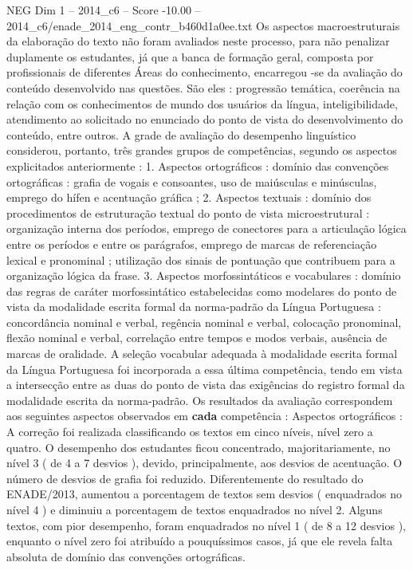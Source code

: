 \begin{textsample}{NEG Dim 1 – 2014\_c6 – Score -10.00 – 2014\_c6/enade\_2014\_eng\_contr\_b460d1a0ee.txt}
Os aspectos macroestruturais da elaboração do texto não foram avaliados neste processo, para não penalizar duplamente os estudantes, já que a banca de formação geral, composta por profissionais de diferentes Áreas do conhecimento, encarregou -se da avaliação do conteúdo desenvolvido nas questões.
São eles : progressão temática, coerência na relação com os conhecimentos de mundo dos usuários da língua, inteligibilidade, atendimento ao solicitado no enunciado do ponto de vista do desenvolvimento do conteúdo, entre outros.
A grade de avaliação do desempenho linguístico considerou, portanto, três grandes grupos de competências, segundo os aspectos explicitados anteriormente : 1.
Aspectos ortográficos : domínio das convenções ortográficas : grafia de vogais e consoantes, uso de maiúsculas e minúsculas, emprego do hífen e acentuação gráfica ; 2.
Aspectos textuais : domínio dos procedimentos de estruturação textual do ponto de vista microestrutural : organização interna dos períodos, emprego de conectores para a articulação lógica entre os períodos e entre os parágrafos, emprego de marcas de referenciação lexical e pronominal ; utilização dos sinais de pontuação que contribuem para a organização lógica da frase. 3.
Aspectos morfossintáticos e vocabulares : domínio das regras de caráter morfossintático estabelecidas como modelares do ponto de vista da modalidade escrita formal da norma-padrão da Língua Portuguesa : concordância nominal e verbal, regência nominal e verbal, colocação pronominal, flexão nominal e verbal, correlação entre tempos e modos verbais, ausência de marcas de oralidade.
A seleção vocabular adequada à modalidade escrita formal da Língua Portuguesa foi incorporada a essa última competência, tendo em vista a intersecção entre as duas do ponto de vista das exigências do registro formal da modalidade escrita da norma-padrão.
Os resultados da avaliação correspondem aos seguintes aspectos observados em \textbf{cada} competência : Aspectos ortográficos : A correção foi realizada classificando os textos em cinco níveis, nível zero a quatro.
O desempenho dos estudantes ficou concentrado, majoritariamente, no nível 3 ( de 4 a 7 desvios ), devido, principalmente, aos desvios de acentuação.
O número de desvios de grafia foi reduzido.
Diferentemente do resultado do ENADE/2013, aumentou a porcentagem de textos sem desvios ( enquadrados no nível 4 ) e diminuiu a porcentagem de textos enquadrados no nível 2.
Alguns textos, com pior desempenho, foram enquadrados no nível 1 ( de 8 a 12 desvios ), enquanto o nível zero foi atribuído a pouquíssimos casos, já que ele revela falta absoluta de domínio das convenções ortográficas.

\end{textsample}
